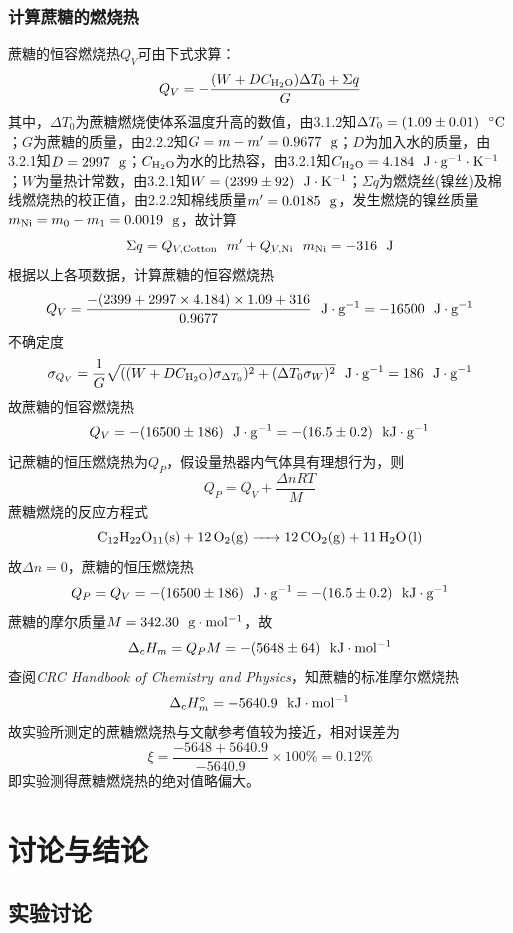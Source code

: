 \documentclass[12pt]{article}
\begin{document}
\subsubsection{计算蔗糖的燃烧热}
蔗糖的恒容燃烧热$Q_{V}$可由下式求算：
$$
Q_{V}=-\frac{(W+DC_{\rm H_{2}O})\Delta T_{0}+\Sigma q}{G}
$$
其中，$\Delta T_{0}$为蔗糖燃烧使体系温度升高的数值，由3.1.2知$\Delta T_{0}=(1.09\pm 0.01)\ \ {\rm ^{\circ}C}$；$G$为蔗糖的质量，由2.2.2知$G=m-m^{\prime}=0.9677\ \ {\rm g}$；$D$为加入水的质量，由3.2.1知$D=2997\ \ {\rm g}$；$C_{\rm H_{2}O}$为水的比热容，由3.2.1知$C_{\rm H_{2}O}=4.184\ \ {\rm J\cdot g^{-1} \cdot K^{-1}}$；$W$为量热计常数，由3.2.1知$W=(2399\pm 92)\ \ {\rm J\cdot K^{-1}}$；$\Sigma q$为燃烧丝(镍丝)及棉线燃烧热的校正值，由2.2.2知棉线质量$m^{\prime}=0.0185\ \ {\rm g}$，发生燃烧的镍丝质量$m_{\rm Ni}=m_{0}-m_{1}=0.0019\ \ {\rm g}$，故计算
$$
\Sigma q=Q_{V, {\rm Cotton}} \ \ m^{\prime}+Q_{V, {\rm Ni}} \ \ m_{\rm Ni}=-316\ \ {\rm J}
$$
根据以上各项数据，计算蔗糖的恒容燃烧热
$$
Q_{V}=\frac{-(2399+2997\times 4.184)\times 1.09+316}{0.9677}\ \ {\rm J\cdot g^{-1}}=-16500\ \ {\rm J\cdot g^{-1}}
$$
不确定度
$$
\sigma_{Q_{V}}=\frac{1}{G}\sqrt{((W+DC_{\rm H_{2}O})\sigma_{\Delta T_{0}})^{2}+(\Delta T_{0}\sigma_{W})^{2}} \ \ {\rm J\cdot g^{-1}}=186\ \ {\rm J\cdot g^{-1}}
$$
故蔗糖的恒容燃烧热
$$
Q_{V}=-(16500\pm 186)\ \ {\rm J\cdot g^{-1}}=-(16.5\pm 0.2)\ \ {\rm kJ\cdot g^{-1}}
$$
记蔗糖的恒压燃烧热为$Q_{P}$，假设量热器内气体具有理想行为，则
$$
Q_{P}=Q_{V}+\frac{\Delta n RT}{M}
$$
蔗糖燃烧的反应方程式
$$
\ce{C12H22O11(s) +  12 O2(g) -> 12 CO2(g) + 11 H2O(l)}
$$
故$\Delta n=0$，蔗糖的恒压燃烧热
$$
Q_{P}=Q_{V}=-(16500\pm 186)\ \ {\rm J\cdot g^{-1}}=-(16.5\pm 0.2)\ \ {\rm kJ\cdot g^{-1}}
$$
蔗糖的摩尔质量$M=342.30\ \ {\rm g\cdot mol^{-1}}$，故
$$
\Delta_{c}H_{m}=Q_{P}M=-(5648\pm 64)\ \ {\rm kJ\cdot mol^{-1}} 
$$
查阅\textit{CRC Handbook of Chemistry and Physics}\citealp{crc}，知蔗糖的标准摩尔燃烧热
$$
\Delta_{c}H^{\circ}_{m}=-5640.9\ \ {\rm kJ\cdot mol^{-1}}
$$
故实验所测定的蔗糖燃烧热与文献参考值较为接近，相对误差为
$$
\xi=\frac{-5648+5640.9}{-5640.9}\times 100\%=0.12\%
$$
即实验测得蔗糖燃烧热的绝对值略偏大。

\vbox{}
 	 \section{讨论与结论}
		\subsection{实验讨论}
\end{document}
